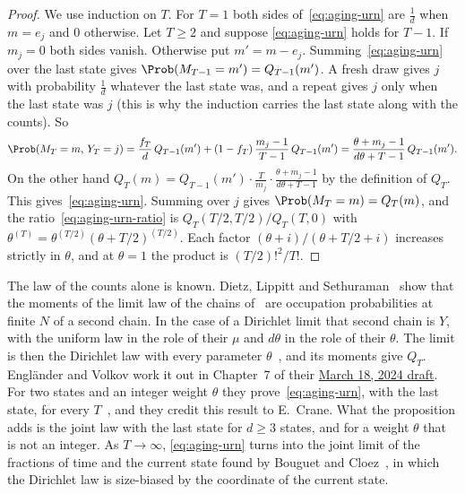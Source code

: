\begin{proof}
We use induction on $T$. For $T=1$ both sides of~\eqref{eq:aging-urn} are
$\frac1d$ when $m=e_j$ and $0$ otherwise. Let $T\ge2$ and suppose
\eqref{eq:aging-urn} holds for $T-1$. If $m_j=0$ both sides vanish. Otherwise
put $m'=m-e_j$. Summing~\eqref{eq:aging-urn} over the last state gives
$\Prob(M_{T-1}=m')=Q_{T-1}(m')$. A fresh draw gives $j$ with probability
$\frac1d$ whatever the last state was, and a repeat gives $j$ only when the
last state was $j$ (this is why the induction carries the last state along
with the counts). So
\[
 \Prob(M_T=m,\,Y_T=j)
 =\frac{f_T}{d}\,Q_{T-1}(m')+(1-f_T)\,\frac{m_j-1}{T-1}\,Q_{T-1}(m')
 =\frac{\theta+m_j-1}{d\theta+T-1}\,Q_{T-1}(m') .
\]
On the other hand
$Q_T(m)=Q_{T-1}(m')\cdot\frac{T}{m_j}\cdot\frac{\theta+m_j-1}{d\theta+T-1}$ by
the definition of $Q_T$. This gives~\eqref{eq:aging-urn}. Summing over $j$
gives $\Prob(M_T=m)=Q_T(m)$, and the ratio~\eqref{eq:aging-urn-ratio} is
$Q_T(T/2,T/2)/Q_T(T,0)$ with
$\theta^{(T)}=\theta^{(T/2)}(\theta+T/2)^{(T/2)}$. Each factor
$(\theta+i)/(\theta+T/2+i)$ increases strictly in $\theta$, and at
$\theta=1$ the product is $(T/2)!^2/T!$.
\end{proof}

The law of the counts alone is known. Dietz, Lippitt and
Sethuraman~\cite[Theorem~2.18]{dls2023} show that the moments of the limit
law of the chains of~\cite{ds2007} are occupation probabilities at finite $N$
of a second chain. In the case of a Dirichlet limit that second chain is
$Y$, with the uniform law in the role of their $\mu$ and $d\theta$ in the role
of their $\theta$. The limit is then the Dirichlet law with every parameter
$\theta$~\cite[Theorem~1.4]{ds2007}, and its moments give $Q_T$.
Engl\"ander and Volkov work it out in Chapter~7 of their
\hyperref[fn:evdraft]{March 18, 2024 draft}. For two states and an integer weight $\theta$
they prove~\eqref{eq:aging-urn}, with the last state, for every
$T$~, and they credit this result to E.~Crane.
What the proposition adds is the joint law with the last state for $d\ge3$
states, and for a weight $\theta$ that is not an integer. As $T\to\infty$,
\eqref{eq:aging-urn} turns into the joint limit of the fractions of time and
the current state found by Bouguet and Cloez~\cite[Proposition~4.1]{bc2018},
in which the Dirichlet law is size-biased by the coordinate of the current
state.

